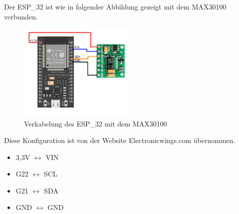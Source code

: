 \documentclass[12pt,oneside]{article}
\begin{document}
  Der ESP\_32\cite{esp32} ist wie in folgender Abbildung gezeigt mit dem MAX30100\cite{max30100breakout} verbunden. 
  \begin{figure}[tph!]
  	\begin{center}
  		\includegraphics[width=0.5\textwidth]{MAX30100 Interfacing ESP32}
	  	\caption{Verkabelung des ESP\_32 mit dem MAX30100\cite{max30100tutorial}}
	  	\label{fig:espSchaltung}
  	\end{center}
  \end{figure}
Diese Konfiguration ist von der Website Electronicwings.com übernommen.
  \begin{itemize}
  	\item 3,3V $\longleftrightarrow$ VIN
  	\item G22 $\longleftrightarrow$ SCL
  	\item G21 $\longleftrightarrow$ SDA
  	\item GND $\longleftrightarrow$ GND
  \end{itemize}
  
  
\end{document}
